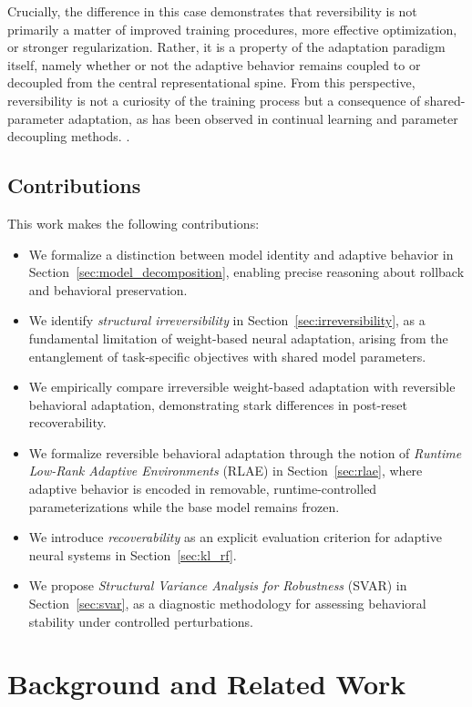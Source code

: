 \documentclass{article}
\begin{document}
	Crucially, the difference in this case demonstrates that reversibility is not primarily a matter of improved training procedures, more effective optimization, or stronger regularization. Rather, it is a property of the adaptation paradigm itself, namely whether or not the adaptive behavior remains coupled to or decoupled from the central representational spine. From this perspective, reversibility is not a curiosity of the training process but a consequence of shared-parameter adaptation, as has been observed in continual learning and parameter decoupling methods. \cite{delange2021continual,lanzillotta2023isolation}.
	
	\subsection{Contributions}
	\label{sect:contribution}
	
	This work makes the following contributions:
	\begin{itemize}
		\item We formalize a distinction between model identity and adaptive behavior in Section~\ref{sec:model_decomposition}, enabling precise reasoning about rollback and behavioral preservation.
		\item We identify \emph{structural irreversibility} in Section~\ref{sec:irreversibility}, as a fundamental limitation of weight-based neural adaptation, arising from the entanglement of task-specific objectives with shared model parameters.
		\item We empirically compare irreversible weight-based adaptation with reversible behavioral adaptation, demonstrating stark differences in post-reset recoverability.
		\item We formalize reversible behavioral adaptation through the notion of \emph{Runtime Low-Rank Adaptive Environments} (RLAE) in Section~\ref{sec:rlae}, where adaptive behavior is encoded in removable, runtime-controlled parameterizations while the base model remains frozen.
		\item We introduce \emph{recoverability} as an explicit evaluation criterion for adaptive neural systems in Section~\ref{sec:kl_rf}.
		\item We propose \emph{Structural Variance Analysis for Robustness} (SVAR) in Section~\ref{sec:svar}, as a diagnostic methodology for assessing behavioral stability under controlled perturbations.
	\end{itemize}
	
	
	\section{Background and Related Work}
	\label{sec:related_work}
	
\end{document}
